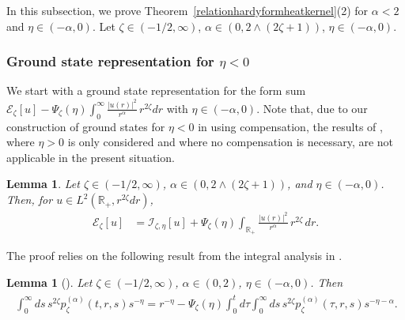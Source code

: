 \documentclass[12pt,reqno]{amsart}
\newtheorem{lemma}[theorem]{Lemma}
\theoremstyle{definition}
\theoremstyle{remark}
\numberwithin{equation}{section}
\newcommand{\1}{\mathbbm{1}}
\newcommand{\R}{\mathbb{R}}
\def\ce{\mathcal{E}}
\def\ci{\mathcal{I}}
\begin{document}
In this subsection, we prove Theorem~\ref{relationhardyformheatkernel}(2) for $\alpha<2$ and $\eta\in(-\alpha,0)$.
Let $\zeta\in(-1/2,\infty)$, $\alpha\in(0,2\wedge(2\zeta+1))$, $\eta\in(-\alpha,0)$.

\subsubsection{Ground state representation for $\eta<0$}
We start with a ground state representation for the form sum $\ce_\zeta[u]-\Psi_\zeta(\eta)\int_0^\infty \frac{|u(r)|^2}{r^\alpha}\,r^{2\zeta}dr$ with $\eta\in(-\alpha,0)$. Note that, due to our construction of ground states for $\eta<0$ in \cite{Bogdanetal2024} using compensation, the results of \cite{BogdanMerz2024}, where $\eta>0$ is only considered and where no compensation is necessary, are not applicable in the present situation.

\begin{lemma}
  \label{gsreprrepulsive}
  Let $\zeta\in(-1/2,\infty)$, $\alpha\in(0,2\wedge(2\zeta+1))$, and $\eta\in(-\alpha,0)$. Then, for $u\in L^2(\R_+,r^{2\zeta}dr)$,
  \begin{align}
    \ce_\zeta[u]
    & = \ci_{\zeta,\eta}[u] + \Psi_\zeta(\eta)\int_{\R_+} \frac{|u(r)|^2}{r^\alpha}\,r^{2\zeta}\,dr.
  \end{align}
\end{lemma}

The proof relies on the following result from the integral analysis in \cite{Bogdanetal2024}.

\begin{lemma}[{\cite[Lemma~3.14]{Bogdanetal2024}}]
  \label{jaklem23}
  Let $\zeta\in(-1/2,\infty)$, $\alpha\in(0,2)$, $\eta\in(-\alpha,0)$. Then
  \begin{align}
    \label{eq:jaklem232}
    \begin{split}
      \int_0^\infty ds\, s^{2\zeta} p_\zeta^{(\alpha)}(t,r,s) s^{-\eta}
      = r^{-\eta} - \Psi_\zeta(\eta)\int_0^t d\tau \int_0^\infty ds\, s^{2\zeta} p_\zeta^{(\alpha)}(\tau,r,s) s^{-\eta-\alpha}.
    \end{split}
  \end{align}
\end{lemma}
\end{document}

